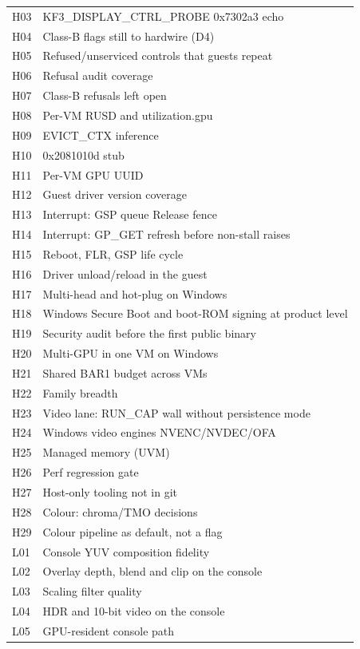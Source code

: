 {\begin{longtable}{@{}p{38mm}p{117mm}@{}}
H03 & KF3\_DISPLAY\_CTRL\_PROBE 0x7302a3 echo \\
H04 & Class-B flags still to hardwire (D4) \\
H05 & Refused/unserviced controls that guests repeat \\
H06 & Refusal audit coverage \\
H07 & Class-B refusals left open \\
H08 & Per-VM RUSD and utilization.gpu \\
H09 & EVICT\_CTX inference \\
H10 & 0x2081010d stub \\
H11 & Per-VM GPU UUID \\
H12 & Guest driver version coverage \\
H13 & Interrupt: GSP queue Release fence \\
H14 & Interrupt: GP\_GET refresh before non-stall raises \\
H15 & Reboot, FLR, GSP life cycle \\
H16 & Driver unload/reload in the guest \\
H17 & Multi-head and hot-plug on Windows \\
H18 & Windows Secure Boot and boot-ROM signing at product level \\
H19 & Security audit before the first public binary \\
H20 & Multi-GPU in one VM on Windows \\
H21 & Shared BAR1 budget across VMs \\
H22 & Family breadth \\
H23 & Video lane: RUN\_CAP wall without persistence mode \\
H24 & Windows video engines NVENC/NVDEC/OFA \\
H25 & Managed memory (UVM) \\
H26 & Perf regression gate \\
H27 & Host-only tooling not in git \\
H28 & Colour: chroma/TMO decisions \\
H29 & Colour pipeline as default, not a flag \\
L01 & Console YUV composition fidelity \\
L02 & Overlay depth, blend and clip on the console \\
L03 & Scaling filter quality \\
L04 & HDR and 10-bit video on the console \\
L05 & GPU-resident console path \\

\end{longtable}}
